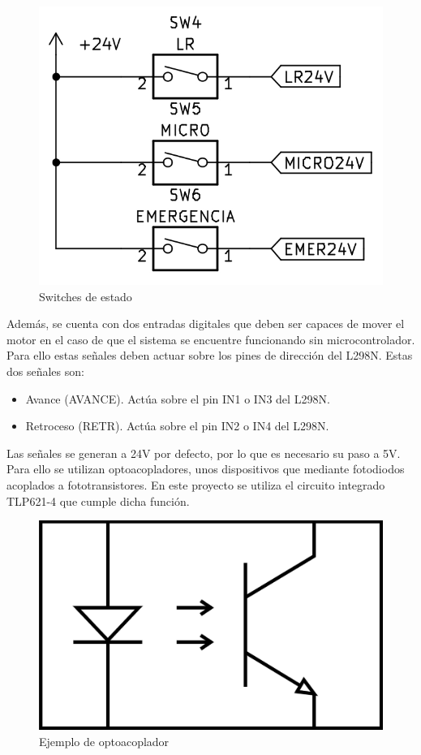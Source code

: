 \begin{figure}[hbtp]
    \centering
    \includegraphics[scale=1.25]{03-placa/switches.png}
    \caption{Switches de estado}
    \label{fig:figura32switches}
    \end{figure}

Además, se cuenta con dos entradas digitales que deben ser capaces de mover el motor en el caso de que el
sistema se encuentre funcionando sin microcontrolador. Para ello estas señales deben actuar sobre los
pines de dirección del L298N. Estas dos señales son:
\begin{itemize}
    \item Avance (AVANCE). Actúa sobre el pin IN1 o IN3 del L298N.
    \item Retroceso (RETR). Actúa sobre el pin IN2 o IN4 del L298N.
\end{itemize}

Las señales se generan a 24V por defecto, por lo que es necesario su paso a 5V. Para ello se utilizan
optoacopladores, unos dispositivos que mediante fotodiodos acoplados a fototransistores. En este proyecto
se utiliza el circuito integrado TLP621-4 que cumple dicha función.

\begin{figure}[hbtp]
    \centering
    \includegraphics[width=\textwidth/4]{03-placa/02-optoac.png}
    \caption{Ejemplo de optoacoplador}
    \label{fig:figura33ejopto}
    \end{figure}

